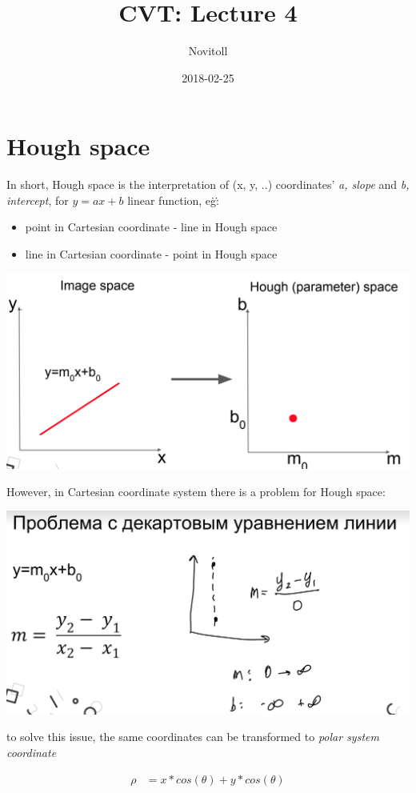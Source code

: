 \documentclass[11pt]{article}
\title{CVT: Lecture 4}
\date{2018-02-25}
\author{Novitoll}
\begin{document}
    \section{Hough space}

    In short, Hough space is the interpretation of (x, y, ..) coordinates' \textit{a, slope} and
    \textit{b, intercept},
    for $y = ax + b$ linear function, e\.g\.:

    \begin{itemize}
        \item point in Cartesian coordinate - line in Hough space
        \item line in Cartesian coordinate - point in Hough space
    \end{itemize}

    \includegraphics[scale=0.2]{hough_space}

    However, in Cartesian coordinate system there is a problem for Hough space:

    \includegraphics[scale=0.2]{cartesian_problem}

    to solve this issue, the same coordinates can be transformed to \emph{polar system coordinate}

    \begin{align}
        \rho &= x * cos(\theta) + y * cos(\theta)
    \end{align}
\end{document}
